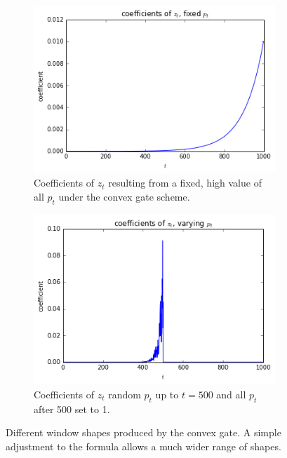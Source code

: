 \begin{figure}[t]
\centering
\begin{subfigure}[t]{0.45\textwidth}
	\centering
	\includegraphics[width=\textwidth]{newarchs/cvexexp}
	\caption{Coefficients of \(z_t\) resulting from a fixed, high value of all \(p_t\)
	under the convex gate scheme.}
\end{subfigure}\hfill
\begin{subfigure}[t]{0.45\textwidth}
	\centering
	\includegraphics[width=\textwidth]{newarchs/cvexspike}
	\caption{Coefficients of \(z_t\) random \(p_t\) up to \(t=500\) and all \(p_t\) after
	500 set to 1.}
\end{subfigure}
\caption[Convex gate shapes]{Different window shapes produced by the convex gate.
 A simple adjustment to the formula allows
a much wider range of shapes.}
\label{fig:cvexgates}
\end{figure}

